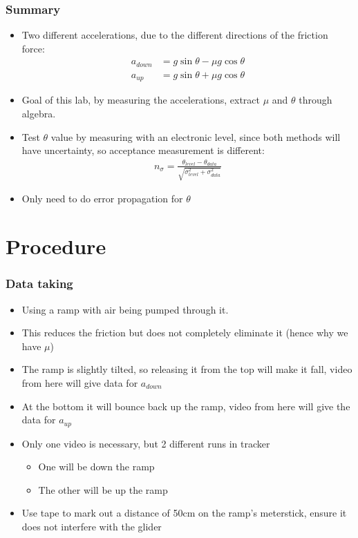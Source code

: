 \documentclass[aspectratio=169]{beamer}
\begin{document}
\begin{frame}
  \frametitle{Summary}
  \begin{itemize}
  \item Two different accelerations, due to the different directions of the friction force:
    \begin{equation*}
      \boxed{\begin{aligned}
        a_{down}&=g\sin\theta-\mu g\cos\theta\\
        a_{up}&=g\sin\theta+\mu g\cos\theta
      \end{aligned}}
    \end{equation*}
  \item Goal of this lab, by measuring the accelerations, extract $\mu$ and $\theta$ through algebra. 
  \item Test $\theta$ value by measuring with an electronic level, since both methods will have uncertainty, so acceptance measurement is different:
    \begin{align*}
      \boxed{n_{\sigma}=\frac{\theta_{level}-\theta_{data}}
      {\sqrt{\sigma_{level}^2+\sigma_{data}^2}}}
    \end{align*}
  \item Only need to do error propagation for $\theta$
  \end{itemize}
\end{frame}

\section{Procedure}
\begin{frame}
  \frametitle{Data taking}
  \begin{itemize}
  \item Using a ramp with air being pumped through it.
  \item This reduces the friction but does not completely eliminate it (hence why we have $\mu$)
  \item The ramp is slightly tilted, so releasing it from the top will make it fall, video from here will give data for $a_{down}$
  \item At the bottom it will bounce back up the ramp, video from here will give the data for $a_{up}$
  \item Only one video is necessary, but 2 different runs in tracker
    \begin{itemize}
    \item One will be down the ramp
    \item The other will be up the ramp
    \end{itemize}
  \item Use tape to mark out a distance of 50cm on the ramp's meterstick, ensure it does not interfere with the glider
  \end{itemize}
\end{frame}
\end{document}
